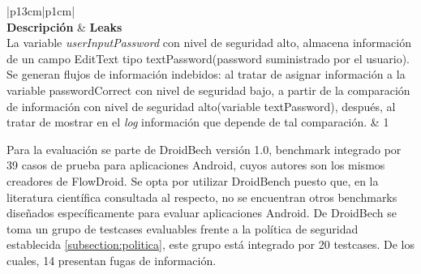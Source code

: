 \begin{table}[t]
\begin{tabular}{|p{13cm}|p{1cm}|}
	\hline
	\\
	\hline
	\textbf{Descripción} & \textbf{Leaks}\\
	\hline
	 La variable \textit{userInputPassword} con nivel de seguridad alto, almacena
	 información de un campo EditText tipo textPassword(password suministrado por
	 el usuario). Se generan flujos de información indebidos: al tratar de asignar
	 información a la variable passwordCorrect con nivel de seguridad bajo, a
	 partir de la comparación de información con nivel de seguridad alto(variable
	 textPassword), después, al tratar de mostrar en el \textit{log} información
	 que depende de tal comparación. & 1\\
	\hline
\end{tabular}
\caption{Aplicaciones de prueba.\newline
Describe parte del conjunto de aplicaciones de prueba. 
}
\label{tab:descripApps0}
\end{table}

Para la evaluación se parte de DroidBech versión 1.0\cite{DroidBenchBenchmarks},
benchmark integrado por 39 casos de prueba para aplicaciones Android, cuyos
autores son los mismos creadores de FlowDroid. Se opta por utilizar DroidBench
puesto que, en la literatura científica consultada al respecto, no se encuentran
otros benchmarks diseñados específicamente para evaluar aplicaciones Android.\newline 
De DroidBech se toma un grupo de testcases evaluables frente a la política de
seguridad establecida \ref{subsection:politica}, este grupo está integrado por
20 testcases. De los cuales, 14 presentan fugas de información.

